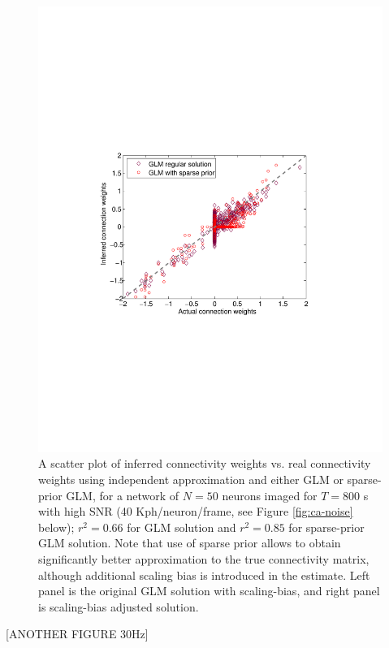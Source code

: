 \begin{figure}
\begin{minipage}[c]{0.45\hsize}
\includegraphics[width=\hsize]{../figs/Figure9b_fluor_sparse_sol}
\end{minipage}
\caption{A scatter plot of inferred connectivity weights vs. real connectivity weights
using independent approximation and either GLM or sparse-prior GLM,
for a network of $N=50$ neurons imaged for $T=800$ s
with high SNR (40 Kph/neuron/frame, see Figure \ref{fig:ca-noise} below); $r^2=0.66$ for GLM solution and $r^2=0.85$ for sparse-prior GLM solution. Note that use of sparse prior allows to obtain significantly better approximation to the true connectivity matrix, although additional scaling bias is introduced in the estimate.
Left panel is the original GLM solution with scaling-bias, and right panel is scaling-bias adjusted solution.}
\label{fig:sparse-sol}
\end{figure}

[ANOTHER FIGURE 30Hz]

